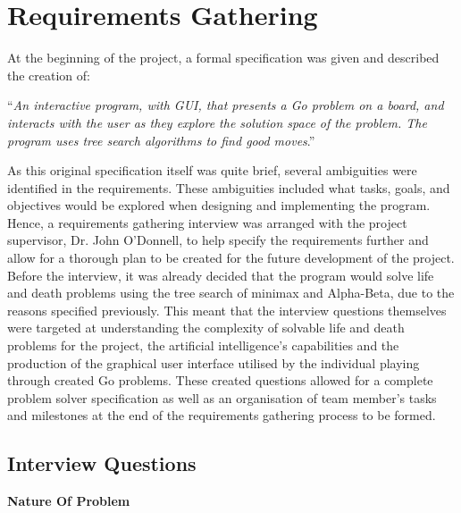 \documentclass{l3proj}
\begin{document}
\section{Requirements Gathering}

At the beginning of the project, a formal specification was given and described the creation of: 
\begin{center}
“\textit{An interactive program, with GUI, that presents a Go problem on a board, and interacts with the user as they explore the solution space of the problem. The program uses tree search algorithms to find good moves}.”  
\end{center}
As this original specification itself was quite brief, several ambiguities were identified in the requirements. These ambiguities included what tasks, goals, and objectives would be explored when designing and implementing the program. Hence, a requirements gathering interview was arranged with the project supervisor, Dr. John O’Donnell, to help specify the requirements further and allow for a thorough plan to be created for the future development of the project. Before the interview, it was already decided that the program would solve life and death problems using the tree search of minimax and Alpha-Beta, due to the reasons specified previously. This meant that the interview questions themselves were targeted at understanding the complexity of solvable life and death problems for the project, the artificial intelligence's capabilities and the production of the graphical user interface utilised by the individual playing through created Go problems. These created questions allowed for a complete problem solver specification as well as an organisation of team member's tasks and milestones at the end of the requirements gathering process to be formed.

\subsection{Interview Questions}

\textbf{Nature Of Problem}
\end{document}
